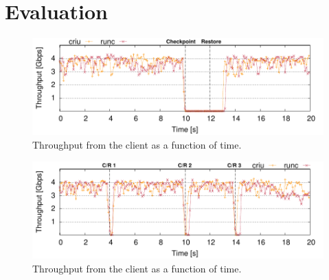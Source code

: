 \section{Evaluation} \label{sec:evaluation}

\begin{figure}[h!]
    \centering
    \includegraphics[width=\linewidth]{./images/tcp_established_downtime_microbenchmark.pdf}
    \caption{Throughput from the client as a function of time.\label{fig:evaluation-downtime}}
\end{figure}

\begin{figure}[h!]
    \centering
    \includegraphics[width=\linewidth]{./images/tcp_established_resolution_microbenchmark.pdf}
    \caption{Throughput from the client as a function of time.\label{fig:evaluation-downtime}}
\end{figure}

